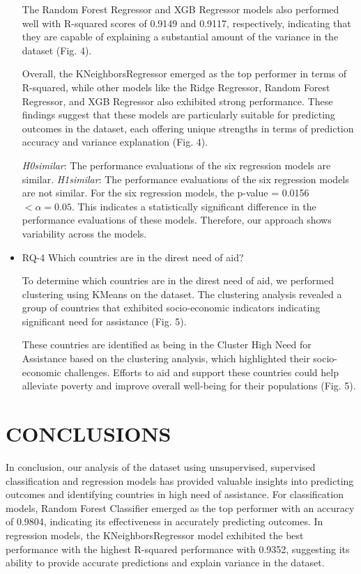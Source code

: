 \documentclass{article}
\begin{document}
\begin{multicols}{2}
\begin{itemize}
The Random Forest Regressor and XGB Regressor models also performed well with R-squared scores of 0.9149 and 0.9117, respectively, indicating that they are capable of explaining a substantial amount of the variance in the dataset (Fig. 4).

Overall, the KNeighborsRegressor emerged as the top performer in terms of R-squared, while other models like the Ridge Regressor, Random Forest Regressor, and XGB Regressor also exhibited strong performance. These findings suggest that these models are particularly suitable for predicting outcomes in the dataset, each offering unique strengths in terms of prediction accuracy and variance explanation (Fig. 4).

\textit{H0similar}: The performance evaluations of the six regression models are similar. \textit{H1similar}: The performance evaluations of the six regression models are not similar. For the six regression models, the p-value = 0.0156 \( < \alpha = 0.05 \). This indicates a statistically significant difference in the performance evaluations of these models. Therefore, our approach shows variability across the models.

    \item RQ-4	Which countries are in the direst need of aid?
    
To determine which countries are in the direst need of aid, we performed clustering using KMeans on the dataset. The clustering analysis revealed a group of countries that exhibited socio-economic indicators indicating significant need for assistance (Fig. 5).

These countries are identified as being in the Cluster High Need for Assistance based on the clustering analysis, which highlighted their socio-economic challenges. Efforts to aid and support these countries could help alleviate poverty and improve overall well-being for their populations (Fig. 5).
\end{itemize}

\section{CONCLUSIONS}
In conclusion, our analysis of the dataset using unsupervised, supervised classification and regression models has provided valuable insights into predicting outcomes and identifying countries in high need of assistance. For classification models, Random Forest Classifier emerged as the top performer with an accuracy of 0.9804, indicating its effectiveness in accurately predicting outcomes. In regression models, the KNeighborsRegressor model exhibited the best performance with the highest R-squared performance with 0.9352, suggesting its ability to provide accurate predictions and explain variance in the dataset.


\end{multicols}
\end{document}
